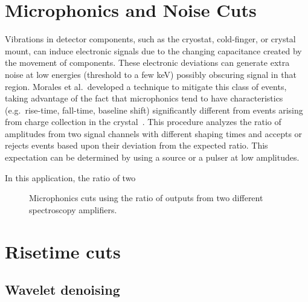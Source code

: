 	
	
	\section{Microphonics and Noise Cuts}
     	\label{sec:MicroCuts}	

	Vibrations in detector components, such as the cryostat, cold-finger, or crystal mount, can induce electronic signals due to the changing capacitance created by the movement of components.  These electronic deviations can generate extra noise at low energies (threshold to a few keV) possibly obscuring signal in that region.  Morales et al.~developed a technique to mitigate this class of events, taking advantage of the fact that microphonics tend to have characteristics (e.g.~rise-time, fall-time, baseline shift) significantly different from events arising from charge collection in the crystal~\cite{Morales1992410}.  This procedure analyzes the ratio of amplitudes from two signal channels with different shaping times  and accepts or rejects events based upon their deviation from the expected ratio.  This expectation can be determined by using a source or a pulser at low amplitudes.  
	
	In this application, the ratio of two 

			\begin{figure}
				\centering
				\caption[BeGe microphonics cuts]
				{Microphonics cuts using the ratio of outputs from two different spectroscopy amplifiers.}
				\label{fig:RatioOfShapedChannels}
			\end{figure}


	\section{Risetime cuts}
     	\label{sec:RisetimeCuts}	

		\subsection{Wavelet denoising}
	     	\label{sec:RisetimeCutsWaveletDenoise}
					
